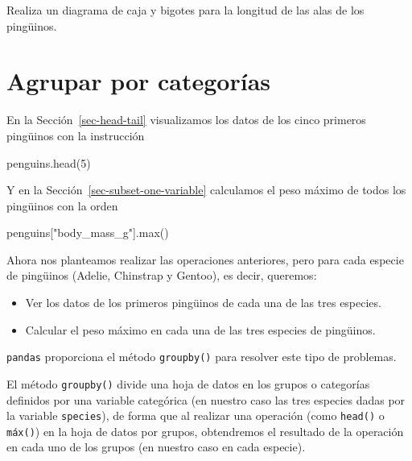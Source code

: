 \documentclass[
  a4paper,
  noprof,
  12pt,
  notoc,
  nosols,
  nobib]{mnye}
\newenvironment{Shaded}{\begin{snugshade}}{\end{snugshade}}
\newcommand{\BuiltInTok}[1]{\textcolor[rgb]{0.00,0.23,0.31}{#1}}
\newcommand{\DecValTok}[1]{\textcolor[rgb]{0.68,0.00,0.00}{#1}}
\newcommand{\NormalTok}[1]{\textcolor[rgb]{0.00,0.23,0.31}{#1}}
\newcommand{\StringTok}[1]{\textcolor[rgb]{0.13,0.47,0.30}{#1}}
\providecommand{\tightlist}{%
  \setlength{\itemsep}{0pt}\setlength{\parskip}{0pt}}\usepackage{longtable,booktabs,array}
\renewenvironment{exercise}[1][]{
            \if\relax\detokenize{#1}\relax
                \ex
            \else
                \ex[note={#1}]
            \fi
        }{\endex}
\theoremstyle{definition}
\newtheorem{exercise}{Ejercicio}[section]
\theoremstyle{remark}
\begin{document}
\begin{exercise}[]%
\protect\hypertarget{exr-1numerical-boxplot}{}\label{exr-1numerical-boxplot}%
Realiza un diagrama de caja y bigotes para la longitud de las alas de
los pingüinos.

\end{exercise}


\hypertarget{sec-groupby}{%
\section{Agrupar por categorías}\label{sec-groupby}}

En la Sección~\ref{sec-head-tail} visualizamos los datos de los cinco
primeros pingüinos con la instrucción

\begin{Shaded}
\begin{Highlighting}[]
\NormalTok{penguins.head(}\DecValTok{5}\NormalTok{)}
\end{Highlighting}
\end{Shaded}

Y en la Sección~\ref{sec-subset-one-variable} calculamos el peso máximo
de todos los pingüinos con la orden

\begin{Shaded}
\begin{Highlighting}[]
\NormalTok{penguins[}\StringTok{"body\_mass\_g"}\NormalTok{].}\BuiltInTok{max}\NormalTok{()}
\end{Highlighting}
\end{Shaded}

Ahora nos planteamos realizar las operaciones anteriores, pero para cada
especie de pingüinos (Adelie, Chinstrap y Gentoo), es decir, queremos:

\begin{itemize}
\tightlist
\item
  Ver los datos de los primeros pingüinos de cada una de las tres
  especies.
\item
  Calcular el peso máximo en cada una de las tres especies de pingüinos.
\end{itemize}

\texttt{pandas} proporciona el método \texttt{groupby()} para resolver
este tipo de problemas.

El método \texttt{groupby()} divide una hoja de datos en los grupos o
categorías definidos por una variable categórica (en nuestro caso las
tres especies dadas por la variable \texttt{species}), de forma que al
realizar una operación (como \texttt{head()} o \texttt{máx()}) en la
hoja de datos por grupos, obtendremos el resultado de la operación en
cada uno de los grupos (en nuestro caso en cada especie).
\end{document}
